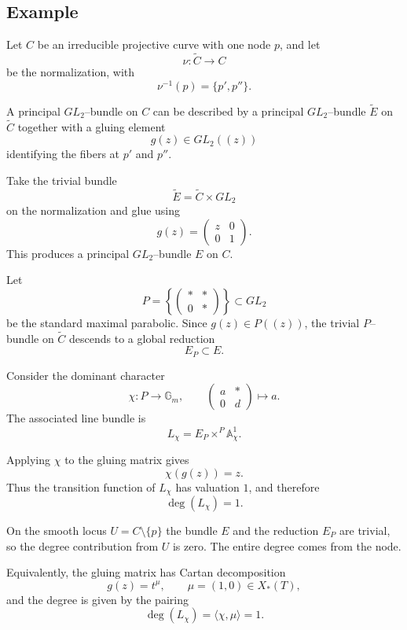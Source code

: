 \documentclass[12pt]{article}
\begin{document}
\subsection{Example}
\begin{example}
Let $C$ be an irreducible projective curve with one node $p$, and let
\[
\nu:\widetilde C \to C
\]
be the normalization, with
\[
\nu^{-1}(p)=\{p',p''\}.
\]

A principal $GL_2$--bundle on $C$ can be described by a principal
$GL_2$--bundle $\widetilde E$ on $\widetilde C$ together with a gluing
element
\[
g(z)\in GL_2((z))
\]
identifying the fibers at $p'$ and $p''$.

\medskip

Take the trivial bundle
\[
\widetilde E = \widetilde C \times GL_2
\]
on the normalization and glue using
\[
g(z)=
\begin{pmatrix}
z & 0\\
0 & 1
\end{pmatrix}.
\]
This produces a principal $GL_2$--bundle $E$ on $C$.

\medskip

Let
\[
P=
\left\{
\begin{pmatrix}
* & *\\
0 & *
\end{pmatrix}
\right\}
\subset GL_2
\]
be the standard maximal parabolic.  Since $g(z)\in P((z))$, the trivial
$P$--bundle on $\widetilde C$ descends to a global reduction
\[
E_P \subset E .
\]

\medskip

Consider the dominant character
\[
\chi:
P \to \mathbb G_m,
\qquad
\begin{pmatrix}
a & *\\
0 & d
\end{pmatrix}
\mapsto a .
\]
The associated line bundle is
\[
L_\chi = E_P \times^P \mathbb A^1_\chi .
\]

Applying $\chi$ to the gluing matrix gives
\[
\chi(g(z)) = z.
\]
Thus the transition function of $L_\chi$ has valuation $1$, and
therefore
\[
\deg(L_\chi)=1.
\]

\medskip

On the smooth locus $U=C\setminus\{p\}$ the bundle $E$ and the
reduction $E_P$ are trivial, so the degree contribution from $U$ is
zero.  The entire degree comes from the node.

\medskip

Equivalently, the gluing matrix has Cartan decomposition
\[
g(z)=t^\mu, \qquad \mu=(1,0)\in X_*(T),
\]
and the degree is given by the pairing
\[
\deg(L_\chi) = \langle \chi,\mu \rangle = 1 .
\]
\end{example}
\end{document}
